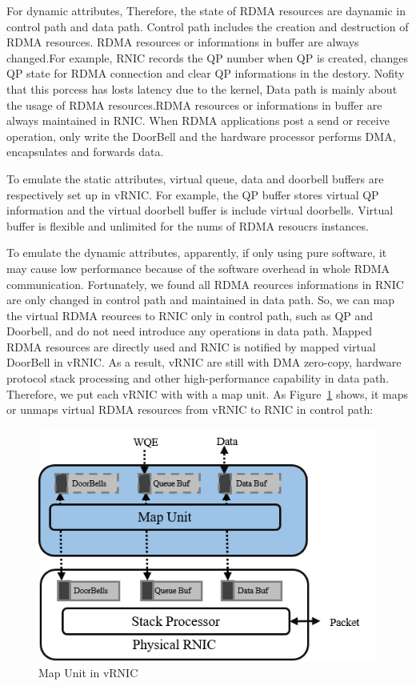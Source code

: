 For dynamic attributes, Therefore, the state of RDMA resources are daynamic in control path and data path. Control path includes the creation and destruction of RDMA resources. RDMA resources or informations in buffer are always changed.For example, RNIC records the QP number when QP is created, changes QP state for RDMA connection and clear QP informations in the destory. Nofity that this porcess has losts latency due to the kernel, Data path is mainly about the usage of RDMA resources.RDMA resources or informations in buffer are always maintained in RNIC. When RDMA applications post a send or receive operation, only write the DoorBell and the hardware processor performs DMA, encapsulates and forwards data.

To emulate the static attributes, virtual queue, data and doorbell buffers are respectively set up in vRNIC. For example, the QP buffer stores virtual QP information and the virtual doorbell buffer is include virtual doorbells. Virtual buffer is flexible and unlimited for the nums of RDMA resoucrs instances. 

To emulate the dynamic attributes, apparently, if only using pure software, it may cause low performance because of the software overhead in whole RDMA communication. Fortunately, we found all RDMA reources informations in RNIC are only changed in control path and maintained in data path. So, we can map the virtual RDMA reources to RNIC only in control path, such as QP and Doorbell,  and do not need introduce any operations in data path. Mapped RDMA resources are directly used and RNIC is notified by mapped virtual DoorBell in vRNIC. As a result, vRNIC are still with DMA zero-copy, hardware protocol stack processing and other high-performance capability in data path. Therefore, we put each vRNIC with with a map unit. As Figure~\ref{fig:map-unit} shows, it maps or unmaps virtual RDMA resources from vRNIC to RNIC in control path:

\begin{figure}[!ht]
	\centering
	\includegraphics[width=0.9\linewidth]{images/map-unit}
	\caption{Map Unit in vRNIC}
	\label{fig:map-unit}
\end{figure}

